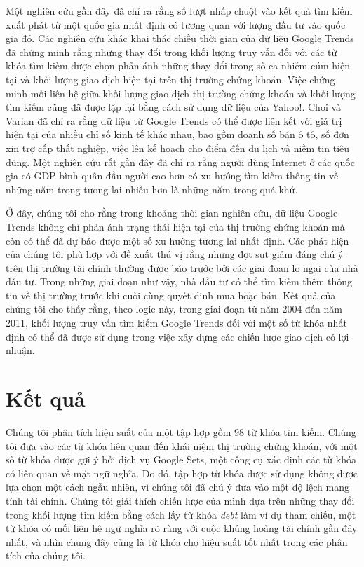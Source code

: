 Một nghiên cứu gần đây đã chỉ ra rằng số lượt nhấp chuột vào kết quả tìm kiếm xuất phát từ một quốc gia nhất định có tương quan với lượng đầu tư vào quốc gia đó. Các nghiên cứu khác khai thác chiều thời gian của dữ liệu Google Trends đã chứng minh rằng những thay đổi trong khối lượng truy vấn đối với các từ khóa tìm kiếm được chọn phản ánh những thay đổi trong số ca nhiễm cúm hiện tại và khối lượng giao dịch hiện tại trên thị trường chứng khoán. Việc chứng minh mối liên hệ giữa khối lượng giao dịch thị trường chứng khoán và khối lượng tìm kiếm cũng đã được lặp lại bằng cách sử dụng dữ liệu của Yahoo!. Choi và Varian đã chỉ ra rằng dữ liệu từ Google Trends có thể được liên kết với giá trị hiện tại của nhiều chỉ số kinh tế khác nhau, bao gồm doanh số bán ô tô, số đơn xin trợ cấp thất nghiệp, việc lên kế hoạch cho điểm đến du lịch và niềm tin tiêu dùng. Một nghiên cứu rất gần đây đã chỉ ra rằng người dùng Internet ở các quốc gia có GDP bình quân đầu người cao hơn có xu hướng tìm kiếm thông tin về những năm trong tương lai nhiều hơn là những năm trong quá khứ.

Ở đây, chúng tôi cho rằng trong khoảng thời gian nghiên cứu, dữ liệu Google Trends không chỉ phản ánh trạng thái hiện tại của thị trường chứng khoán mà còn có thể đã dự báo được một số xu hướng tương lai nhất định. Các phát hiện của chúng tôi phù hợp với đề xuất thú vị rằng những đợt sụt giảm đáng chú ý trên thị trường tài chính thường được báo trước bởi các giai đoạn lo ngại của nhà đầu tư. Trong những giai đoạn như vậy, nhà đầu tư có thể tìm kiếm thêm thông tin về thị trường trước khi cuối cùng quyết định mua hoặc bán. Kết quả của chúng tôi cho thấy rằng, theo logic này, trong giai đoạn từ năm 2004 đến năm 2011, khối lượng truy vấn tìm kiếm Google Trends đối với một số từ khóa nhất định có thể đã được sử dụng trong việc xây dựng các chiến lược giao dịch có lợi nhuận.

\section{Kết quả}

Chúng tôi phân tích hiệu suất của một tập hợp gồm 98 từ khóa tìm kiếm. Chúng tôi đưa vào các từ khóa liên quan đến khái niệm thị trường chứng khoán, với một số từ khóa được gợi ý bởi dịch vụ Google Sets, một công cụ xác định các từ khóa có liên quan về mặt ngữ nghĩa. Do đó, tập hợp từ khóa được sử dụng không được lựa chọn một cách ngẫu nhiên, vì chúng tôi đã chủ ý đưa vào một độ lệch mang tính tài chính. Chúng tôi giải thích chiến lược của mình dựa trên những thay đổi trong khối lượng tìm kiếm bằng cách lấy từ khóa \emph{debt} làm ví dụ tham chiếu, một từ khóa có mối liên hệ ngữ nghĩa rõ ràng với cuộc khủng hoảng tài chính gần đây nhất, và nhìn chung đây cũng là từ khóa cho hiệu suất tốt nhất trong các phân tích của chúng tôi.

